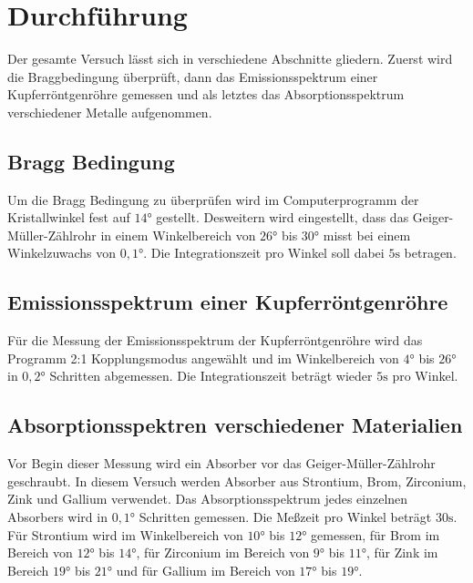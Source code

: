 \section{Durchführung}
\label{sec:Durchführung}
Der gesamte Versuch lässt sich in verschiedene Abschnitte gliedern. Zuerst wird die Braggbedingung überprüft, dann das Emissionsspektrum einer Kupferröntgenröhre 
gemessen und als letztes das Absorptionsspektrum verschiedener Metalle aufgenommen. 
\subsection{Bragg Bedingung}
Um die Bragg Bedingung zu überprüfen wird im Computerprogramm der Kristallwinkel fest auf $14 \unit{\degree}$ gestellt. Desweitern wird eingestellt, 
dass das Geiger-Müller-Zählrohr in einem Winkelbereich von $26 \unit{\degree}$ bis $30 \unit{\degree}$ misst bei einem Winkelzuwachs von $0,1 \unit{\degree}$. Die 
Integrationszeit pro Winkel soll dabei $5 \unit{\second}$ betragen. 

\subsection{Emissionsspektrum einer Kupferröntgenröhre}
Für die Messung der Emissionsspektrum der Kupferröntgenröhre wird das Programm 2:1 Kopplungsmodus angewählt und im Winkelbereich von $4 \unit{\degree}$ bis $26 \unit{\degree}$
in $0,2 \unit{\degree}$ Schritten abgemessen. Die Integrationszeit beträgt wieder $5 \unit{\second}$ pro Winkel. 

\subsection{Absorptionsspektren verschiedener Materialien}
Vor Begin dieser Messung wird ein Absorber vor das Geiger-Müller-Zählrohr geschraubt. In diesem Versuch werden Absorber aus Strontium, Brom, Zirconium, Zink und Gallium
verwendet. Das Absorptionsspektrum jedes einzelnen Absorbers wird in $0,1 \unit{\degree}$ Schritten gemessen. Die Meßzeit pro Winkel beträgt $30 \unit{\second}$. 
Für Strontium wird im Winkelbereich von $10 \unit{\degree}$ bis $12 \unit{\degree}$ gemessen, für Brom im Bereich von $12 \unit{\degree}$ bis $14 \unit{\degree}$, 
für Zirconium im Bereich von $9 \unit{\degree}$ bis $11 \unit{\degree}$, für Zink im Bereich $19 \unit{\degree}$ bis $21 \unit{\degree}$ und für Gallium im 
Bereich von $17 \unit{\degree}$ bis $19 \unit{\degree}$. 
